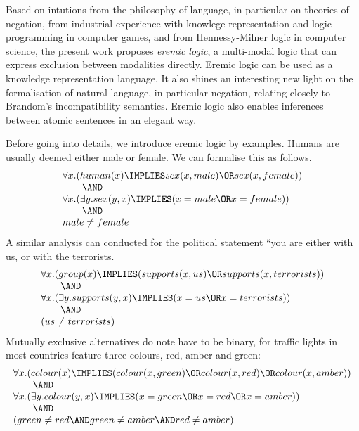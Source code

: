 Based on intutions from the philosophy of language, in particular on
theories of negation, from industrial experience with knowlege
representation and logic programming in computer games, and from
Hennessy-Milner logic in computer science, the present work proposes
\emph{eremic logic}, a multi-modal logic that can express exclusion
between modalities directly. Eremic logic can be used as a knowledge
representation language.  It also shines an interesting new light on
the formalisation of natural language, in particular negation,
relating closely to Brandom's incompatibility semantics. Eremic logic
also enables inferences between atomic sentences in an elegant way.

Before going into details, we introduce eremic logic by examples.  
Humans are usually deemed  either male or female. We can formalise this
as follows.
\[
   \begin{array}{l}
   \forall x. (human(x) \IMPLIES sex(x, male) \OR sex(x, female)) \\
   \qquad\AND        \\
   \forall x.( \exists y.sex(y, x) \IMPLIES ( x = male \OR x = female )) \\
   \qquad\AND \\
   male \neq female
   \end{array}
\]
A similar analysis can conducted for the political statement ``you are
either with us, or with the terrorists.
\[
   \begin{array}{l}
   \forall x.(group(x) \IMPLIES ( supports(x, us) \OR supports(x, terrorists)) \\
   \qquad\AND\\
   \forall x.( \exists y.supports(y, x) \IMPLIES ( x = us \OR x = terrorists )) \\
   \qquad\AND\\
   ( us \neq terrorists)
   \end{array}
\]
Mutually exclusive alternatives do note have to be binary, for traffic
lights in most countries feature three colours, red, amber and green:
\[
   \begin{array}{l}
   \forall x.(colour(x) \IMPLIES ( colour(x, green) \OR colour(x, red) \OR colour(x, amber)) \\
   \qquad\AND\\
   \forall x.( \exists y.colour(y, x) \IMPLIES ( x = green \OR x = red \OR x = amber )) \\
   \qquad\AND\\
   ( green \neq red \AND green \neq amber \AND red \neq amber)
   \end{array}
\]

